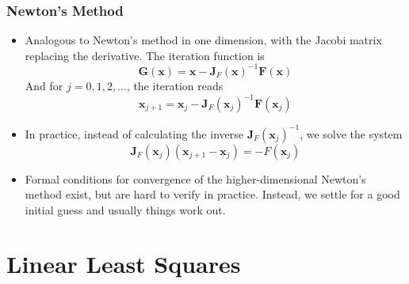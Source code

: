 \documentclass[11pt, a4paper]{article}
\newcommand{\mat}[1]{\mathbf{#1}} %
\begin{document}
\subsubsection{Newton's Method}
\begin{itemize}
	\item Analogous to Newton's method in one dimension, with the Jacobi matrix replacing the derivative. The iteration function is
	\begin{equation*}
		\bm{G}(\bm{x}) = \bm{x} - \mat{J}_{F}(\bm{x})^{-1} \bm{F}(\bm{x})
	\end{equation*}
	And for $ j = 0, 1, 2, \ldots $, the iteration reads
	\begin{equation*}
		\bm{x}_{j+1} = \bm{x}_{j} - \mat{J}_{F}(\bm{x}_{j})^{-1} \bm{F}(\bm{x}_{j})
	\end{equation*}
	
	\item In practice, instead of calculating the inverse $ \mat{J}_{F}(\bm{x}_{j})^{-1} $, we solve the system 
	\begin{equation*}
		\mat{J}_{F}(\bm{x}_{j}) (\bm{x}_{j+1} - \bm{x}_{j}) = - F(\bm{x}_{j})
	\end{equation*}
	
	\item Formal conditions for convergence of the higher-dimensional Newton's method exist, but are hard to verify in practice. Instead, we settle for a good initial guess and usually things work out.
\end{itemize}

\newpage

\section{Linear Least Squares}
\end{document}

